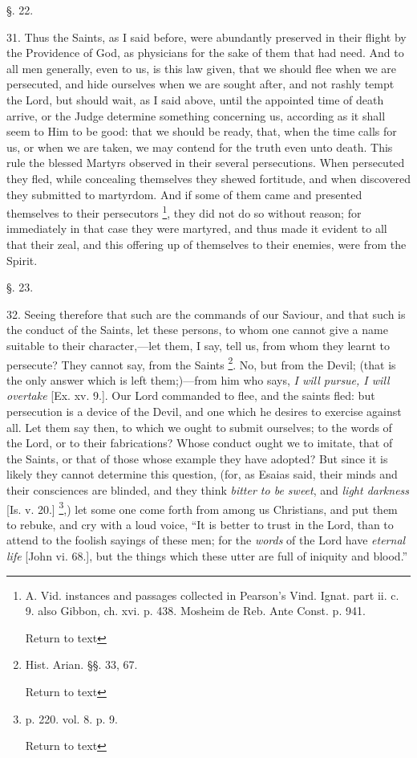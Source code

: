 §. 22.

31. Thus the Saints, as I said before, were
abundantly preserved in their flight by the Providence of God, as
physicians for the sake of them that had need. And to all men
generally, even to us, is this law given, that we should flee when we
are persecuted, and hide ourselves when we are sought after, and not
rashly tempt the Lord, but should wait, as I said above, until the
appointed time of death arrive, or the Judge determine something
concerning us, according as it shall seem to Him to be good: that we
should be ready, that, when the time calls for us, or when we are
taken, we may contend for the truth even unto death. This rule the
blessed Martyrs observed in their several persecutions. When
persecuted they fled, while concealing themselves they shewed
fortitude, and when discovered they submitted to martyrdom. And if
some of them came and presented themselves to their persecutors \footnote{A.
Vid. instances and passages collected in Pearson's Vind. Ignat. part
ii. c. 9. also Gibbon, ch. xvi. p. 438. Mosheim de Reb. Ante Const. p.
941.

Return to text}, they did not do so without reason; for immediately in that case
they were martyred, and thus made it evident to all that their zeal,
and this offering up of themselves to their enemies, were from the
Spirit.

§. 23.

32. Seeing therefore that such are the commands
of our Saviour, and that such is the conduct of the Saints, let these
persons, to whom one cannot give a name suitable to their
character,—let them, I say, tell us, from whom they learnt to
persecute? They cannot say, from the Saints \footnote{Hist. Arian. §§. 33, 67.

Return to text}. No, but from the Devil; (that is the only answer which is left
them;)—from him who says, \emph{I will pursue, I will overtake} [Ex.
xv. 9.]. Our Lord commanded to flee, and the saints fled: but
persecution is a device of the Devil, and one which he desires to
exercise against all. Let them say then, to which we ought to submit
ourselves; to the words of the Lord, or to their fabrications? Whose
conduct ought we to imitate, that of the Saints, or that of those
whose example they have adopted? But since it is likely they cannot
determine this question, (for, as Esaias said, their minds and their
consciences are blinded, and they think \emph{bitter to be sweet}, and
\emph{light darkness} [Is. v. 20.] \footnote{p. 220. vol. 8. p. 9.

Return to text},)
let some one come forth from among us Christians, and put them to
rebuke, and cry with a loud voice, “It is better to trust in the
Lord, than to attend to the foolish sayings of these men; for the \emph{words}
of the Lord have \emph{eternal life} [John vi. 68.], but the things
which these utter are full of iniquity and blood.”

